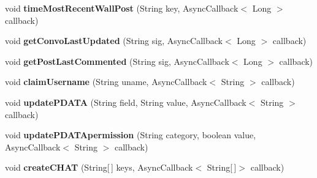 \begin{DoxyCompactItemize}
\item 
\hypertarget{interfaceballmerpeak_1_1turtlenet_1_1client_1_1TurtlenetAsync_a7c5cf7164c931cc259f2f3d536e4a5b6}{void {\bfseries time\-Most\-Recent\-Wall\-Post} (String key, Async\-Callback$<$ Long $>$ callback)}\label{interfaceballmerpeak_1_1turtlenet_1_1client_1_1TurtlenetAsync_a7c5cf7164c931cc259f2f3d536e4a5b6}

\item 
\hypertarget{interfaceballmerpeak_1_1turtlenet_1_1client_1_1TurtlenetAsync_aeea4d58517cb71624be15cec8b0510de}{void {\bfseries get\-Convo\-Last\-Updated} (String sig, Async\-Callback$<$ Long $>$ callback)}\label{interfaceballmerpeak_1_1turtlenet_1_1client_1_1TurtlenetAsync_aeea4d58517cb71624be15cec8b0510de}

\item 
\hypertarget{interfaceballmerpeak_1_1turtlenet_1_1client_1_1TurtlenetAsync_a834d3273d3a41654fdb00ba979ff150b}{void {\bfseries get\-Post\-Last\-Commented} (String sig, Async\-Callback$<$ Long $>$ callback)}\label{interfaceballmerpeak_1_1turtlenet_1_1client_1_1TurtlenetAsync_a834d3273d3a41654fdb00ba979ff150b}

\item 
\hypertarget{interfaceballmerpeak_1_1turtlenet_1_1client_1_1TurtlenetAsync_a1069bf6f78fede8e4f78a2f2e39df27d}{void {\bfseries claim\-Username} (String uname, Async\-Callback$<$ String $>$ callback)}\label{interfaceballmerpeak_1_1turtlenet_1_1client_1_1TurtlenetAsync_a1069bf6f78fede8e4f78a2f2e39df27d}

\item 
\hypertarget{interfaceballmerpeak_1_1turtlenet_1_1client_1_1TurtlenetAsync_a7a7cbb0b042da41c7eeadd290b42a35d}{void {\bfseries update\-P\-D\-A\-T\-A} (String field, String value, Async\-Callback$<$ String $>$ callback)}\label{interfaceballmerpeak_1_1turtlenet_1_1client_1_1TurtlenetAsync_a7a7cbb0b042da41c7eeadd290b42a35d}

\item 
\hypertarget{interfaceballmerpeak_1_1turtlenet_1_1client_1_1TurtlenetAsync_a148056124adb3370e75cafef6f938775}{void {\bfseries update\-P\-D\-A\-T\-Apermission} (String category, boolean value, Async\-Callback$<$ String $>$ callback)}\label{interfaceballmerpeak_1_1turtlenet_1_1client_1_1TurtlenetAsync_a148056124adb3370e75cafef6f938775}

\item 
\hypertarget{interfaceballmerpeak_1_1turtlenet_1_1client_1_1TurtlenetAsync_a107ee449c88dfac657425fdb5933ba93}{void {\bfseries create\-C\-H\-A\-T} (String\mbox{[}$\,$\mbox{]} keys, Async\-Callback$<$ String\mbox{[}$\,$\mbox{]}$>$ callback)}\label{interfaceballmerpeak_1_1turtlenet_1_1client_1_1TurtlenetAsync_a107ee449c88dfac657425fdb5933ba93}


\end{DoxyCompactItemize}
